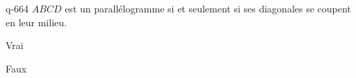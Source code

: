 \begin{truefalse}{q-664}
$ABCD$ est un parallélogramme si et seulement si ses diagonales se coupent en leur milieu.
\item* Vrai
\item Faux
\end{truefalse}

